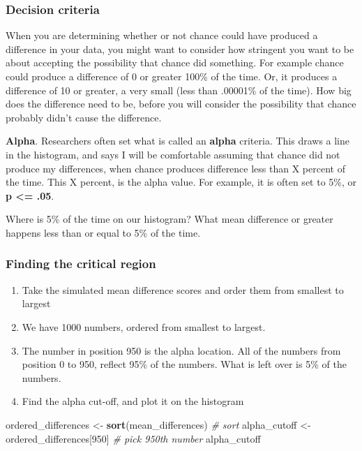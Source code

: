 \documentclass[]{book}
\newenvironment{Shaded}{\begin{snugshade}}{\end{snugshade}}
\newcommand{\KeywordTok}[1]{\textcolor[rgb]{0.13,0.29,0.53}{\textbf{{#1}}}}
\newcommand{\DecValTok}[1]{\textcolor[rgb]{0.00,0.00,0.81}{{#1}}}
\newcommand{\StringTok}[1]{\textcolor[rgb]{0.31,0.60,0.02}{{#1}}}
\newcommand{\CommentTok}[1]{\textcolor[rgb]{0.56,0.35,0.01}{\textit{{#1}}}}
\newcommand{\NormalTok}[1]{{#1}}
\providecommand{\tightlist}{%
  \setlength{\itemsep}{0pt}\setlength{\parskip}{0pt}}
\theoremstyle{definition}
\theoremstyle{definition}
\theoremstyle{definition}
\theoremstyle{remark}
\begin{document}
\subsubsection{Decision criteria}\label{decision-criteria}

When you are determining whether or not chance could have produced a
difference in your data, you might want to consider how stringent you
want to be about accepting the possibility that chance did something.
For example chance could produce a difference of 0 or greater 100\% of
the time. Or, it produces a difference of 10 or greater, a very small
(less than .00001\% of the time). How big does the difference need to
be, before you will consider the possibility that chance probably didn't
cause the difference.

\textbf{Alpha}. Researchers often set what is called an \textbf{alpha}
criteria. This draws a line in the histogram, and says I will be
comfortable assuming that chance did not produce my differences, when
chance produces difference less than X percent of the time. This X
percent, is the alpha value. For example, it is often set to 5\%, or
\textbf{p \textless{}= .05}.

Where is 5\% of the time on our histogram? What mean difference or
greater happens less than or equal to 5\% of the time.

\subsubsection{Finding the critical
region}\label{finding-the-critical-region}

\begin{enumerate}
\def\labelenumi{\arabic{enumi}.}
\tightlist
\item
  Take the simulated mean difference scores and order them from smallest
  to largest
\item
  We have 1000 numbers, ordered from smallest to largest.
\item
  The number in position 950 is the alpha location. All of the numbers
  from position 0 to 950, reflect 95\% of the numbers. What is left over
  is 5\% of the numbers.
\item
  Find the alpha cut-off, and plot it on the histogram
\end{enumerate}

\begin{Shaded}
\begin{Highlighting}[]
\NormalTok{ordered_differences <-}\StringTok{ }\KeywordTok{sort}\NormalTok{(mean_differences) }\CommentTok{# sort}
\NormalTok{alpha_cutoff <-}\StringTok{ }\NormalTok{ordered_differences[}\DecValTok{950}\NormalTok{] }\CommentTok{# pick 950th number}
\NormalTok{alpha_cutoff}
\end{Highlighting}
\end{Shaded}
\end{document}
